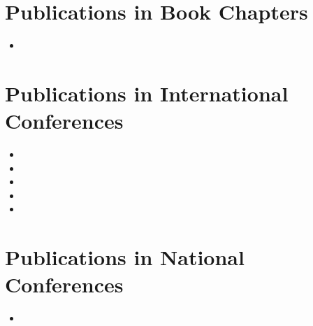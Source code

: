 \section*{Publications in Book Chapters}
\begin{itemize}
\item [\cite{GutierrezAlcoba:ICCSA2015}] 
\end{itemize}

\section*{Publications in International Conferences}
\begin{itemize}
\item [\cite{GutierrezAlcoba:MAGO14}]  
\item [\cite{GutierrezAlcoba:EURO15}]  
\item [\cite{GutierrezAlcoba:EUROPT15}]  
\item [\cite{GutierrezAlcoba:Segovia2017}]
\item [\cite{GutierrezAlcoba:OR2017}]
\end{itemize}

\section*{Publications in National Conferences}
\begin{itemize}
\item [\cite{GutierrezAlcoba:JP15}] 
\end{itemize}




